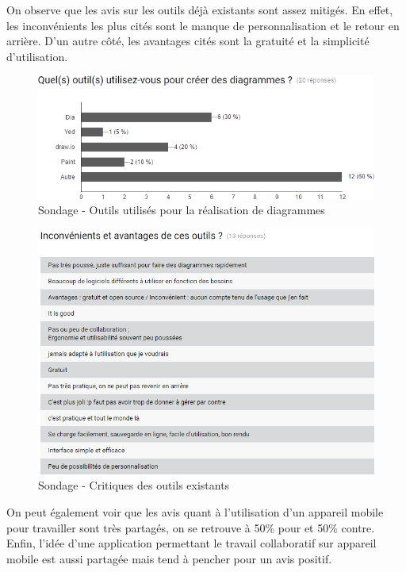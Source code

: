 On observe que les avis sur les outils déjà existants sont assez mitigés.
En effet, les inconvénients les plus cités sont le manque de personnalisation et le retour en arrière.
D'un autre côté, les avantages cités sont la gratuité et la simplicité d'utilisation.

\newpage
\begin{figure}[!h]
	\centering
	\includegraphics[width=\textwidth]{img/sondage_outils}
	\caption{Sondage - Outils utilisés pour la réalisation de diagrammes}
\end{figure}
\vspace*{\fill}
\begin{figure}[!h]
	\centering
	\includegraphics[width=\textwidth]{img/sondage_critique}
	\caption{Sondage - Critiques des outils existants}
\end{figure}
\vspace*{\fill}

\newpage
On peut également voir que les avis quant à l'utilisation d'un appareil mobile pour travailler sont très partagés, on se retrouve à 50\% pour et 50\% contre.
Enfin, l'idée d'une application permettant le travail collaboratif sur appareil mobile est aussi partagée mais tend à pencher pour un avis positif.

